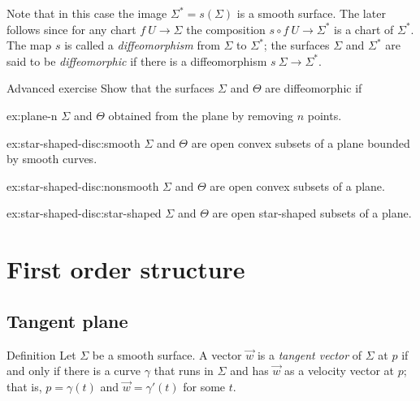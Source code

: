 Note that in this case the image $\Sigma^{*}=s(\Sigma)$ is a smooth surface.
The later follows since for any chart $f\:U\to \Sigma$ the composition $s\circ f\:U\to \Sigma^{*}$ is a chart of $\Sigma^{*}$. 
The map $s$ is called a \emph{diffeomorphism} from $\Sigma$ to $\Sigma^{*}$; the surfaces $\Sigma$ and $\Sigma^{*}$ are said to be {}\emph{diffeomorphic} if there is a diffeomorphism $s\:\Sigma\to\Sigma^{*}$.


\begin{thm}{Advanced exercise}\label{ex:star-shaped-disc}
Show that the surfaces $\Sigma$ and $\Theta$ are diffeomorphic if

\begin{subthm}{ex:plane-n}
$\Sigma$ and $\Theta$ obtained from the plane by removing $n$ points.
\end{subthm}


\begin{subthm}{ex:star-shaped-disc:smooth}
$\Sigma$ and $\Theta$ are open convex subsets of a plane bounded by smooth curves.
\end{subthm}


\begin{subthm}{ex:star-shaped-disc:nonsmooth}
$\Sigma$ and $\Theta$ are open convex subsets of a plane.
\end{subthm}

\begin{subthm}{ex:star-shaped-disc:star-shaped}
$\Sigma$ and $\Theta$ are open star-shaped subsets of a plane.
\end{subthm}
\end{thm}

\chapter{First order structure}

\section{Tangent plane}

\begin{thm}{Definition}\label{def:tangent-vector}
Let $\Sigma$ be a smooth surface.
A vector $\vec w$ is a \emph{tangent vector} of $\Sigma$ at $p$ if and only if there is a curve $\gamma$ that runs in $\Sigma$ and has $\vec w$ as a velocity vector at $p$;
that is, $p=\gamma(t)$ and $\vec w=\gamma'(t)$ for some $t$.
\end{thm}

